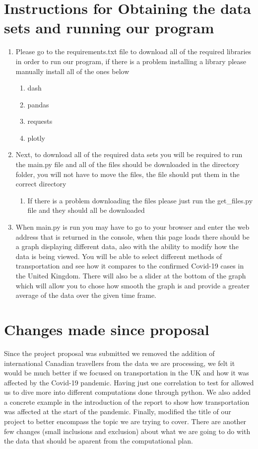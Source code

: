 \documentclass[fontsize=11pt]{article}
\begin{document}
\section*{Instructions for Obtaining the data sets and running our program}
\begin{enumerate}
    \item Please go to the requirements.txt file to download all of the required libraries in order to run our program, if there is a problem installing a library please manually install all of the ones below
    \begin{enumerate}
        \item dash
        \item pandas
        \item requests
        \item plotly
    \end{enumerate}
    \item Next, to download all of the required data sets you will be required to run the main.py file and all of the files should be downloaded in the directory folder, you will not have to move the files, the file should put them in the correct directory
    \begin{enumerate}
        \item If there is a problem downloading the files please just run the get\_files.py file and they should all be downloaded
    \end{enumerate}
    \item When main.py is run you may have to go to your browser and enter the web address that is returned in the console, when this page loads there should be a graph displaying different data, also with the ability to modify how the data is being viewed. You will be able to select different methods of transportation and see how it compares to the confirmed Covid-19 cases in the United Kingdom. There will also be a slider at the bottom of the graph which will allow you to chose how smooth the graph is and provide a greater average of the data over the given time frame.
\end{enumerate}

\section*{Changes made since proposal}
Since the project proposal was submitted we removed the addition of international Canadian travellers from the data we are processing, we felt it would be much better if we focused on transportation in the UK and how it was affected by the Covid-19 pandemic. Having just one correlation to test for allowed us to dive more into different computations done through python. We also added a concrete example in the introduction of the report to show how transportation was affected at the start of the pandemic. Finally, modified the title of our project to better encompass the topic we are trying to cover. There are another few changes (small inclusions and exclusion) about what we are going to do with the data that should be aparent from the computational plan.
\end{document}
